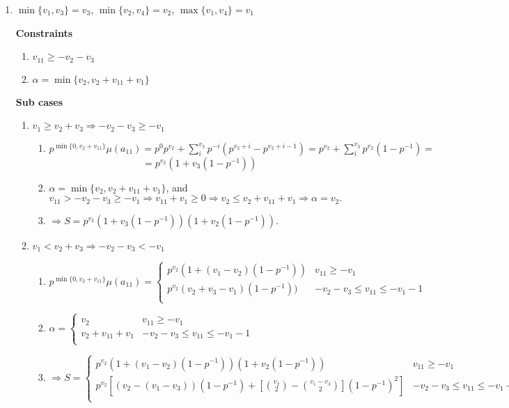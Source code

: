 \documentclass{article}
\begin{document}
\begin{enumerate}
    \item $\min\{v_1,v_3\}=v_3$, $\min\{v_2,v_4\}=v_2$, $\max\{v_1,v_4\}=v_1$
    
    \textbf{Constraints}
    \begin{enumerate}
        \item $v_{11}\geq{-v_2-v_3}$
        \item $\alpha=\min\{v_2,v_2+v_{11}+v_1\}$
    \end{enumerate}
    
    \textbf{Sub cases}
    \begin{enumerate}
        \item $v_1\geq{v_2+v_3}\Rightarrow{-v_2-v_3\geq{-v_1}}$

        \begin{enumerate}
            \item $p^{\min\{0,v_2+v_{11}\}}\mu(a_{11})=p^{0}p^{v_2}+\sum_i^{v_3}p^{-i}(p^{v_2+i}-p^{v_2+i-1})=p^{v_2}+\sum_i^{v_3}p^{v_2}(1-p^{-1})=$\[=p^{v_2}(1+v_3(1-p^{-1}))\]
            \item $\alpha=\min\{v_2,v_2+v_{11}+v_1\}$, and $v_{11}>-v_2-v_3\geq{-v_1}\Rightarrow{v_{11}+v_1\geq{0}}\Rightarrow{v_2\leq{v_2+v_{11}+v_1}}\Rightarrow{\alpha=v_2}.$
            \item $\Rightarrow{S=p^{v_2}(1+v_3(1-p^{-1}))(1+v_2(1-p^{-1}))}.$
        \end{enumerate}

        \item $v_1<{v_2+v_3}\Rightarrow{-v_2-v_3<-v_1}$

        \begin{enumerate}
            \item $p^{\min\{0,v_2+v_{11}\}}\mu(a_{11})=
            \left\{
	\begin{array}{ll}
            p^{v_2}(1+(v_1-v_2)(1-p^{-1})) & v_{11}\geq{-v_1} \\
		  p^{v_2}(v_2+v_3-v_1)(1-p^{-1})) & -v_2-v_3\leq{v_{11}}\leq{-v_1-1} \\
	\end{array}
\right.
$
            \item $\alpha=\left\{
	\begin{array}{ll}
            v_2  & v_{11}\geq{-v_1} \\
		  v_2+v_{11}+v_1 & -v_2-v_3\leq{v_{11}}\leq{-v_1-1} \\
	\end{array}
\right.$
        \item $\Rightarrow{S=\left\{
	\begin{array}{ll}
            p^{v_2}(1+(v_1-v_2)(1-p^{-1}))(1+v_2(1-p^{-1}))  & v_{11}\geq{-v_1} \\
		              p^{v_2}[(v_2-(v_1-v_3))(1-p^{-1})+[\binom{v_2}{2}-\binom{v_1-v_3}{2}](1-p^{-1})^2]  & -v_2-v_3\leq{v_{11}}\leq{-v_1-1} \\
	\end{array}
\right.}.$
        \end{enumerate}


\end{enumerate}
\end{enumerate}
\end{document}

